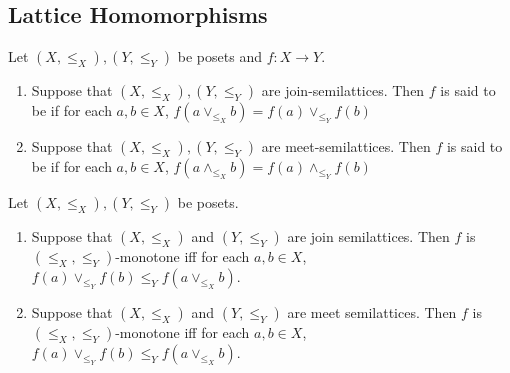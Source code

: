 \documentclass{book}
\begin{document}
	
	
	
	
	
	
	
	
	
	
	
	
	
	
	
	
	
	
	
	
	
	
	
	
	
	
	
	
	
	
	
	
	
	
	
	
	
	
	
	
	
	
	
	
	
	
	
	
	
	
	
	
	
	
	\subsection{Lattice Homomorphisms}
	
	\begin{defn}
		Let $(X, \leq_X), (Y, \leq_Y)$ be posets and $f:X \rightarrow Y$. 
		\begin{enumerate}
			\item Suppose that $(X, \leq_X), (Y, \leq_Y)$ are join-semilattices. Then $f$ is said to be  if for each $a,b \in X$, $f(a \vee_{\leq_X} b) = f(a) \vee_{\leq_Y} f(b)$
			\item Suppose that $(X, \leq_X), (Y, \leq_Y)$ are meet-semilattices. Then $f$ is said to be  if for each $a,b \in X$, $f(a \wedge_{\leq_X} b) = f(a) \wedge_{\leq_Y} f(b)$
		\end{enumerate}
	\end{defn}
	
	\begin{ex}
		Let $(X, \leq_X), (Y, \leq_Y)$ be posets. 
		\begin{enumerate}
			\item Suppose that $(X, \leq_X)$ and $(Y, \leq_Y)$ are join semilattices. Then $f$ is $(\leq_X, \leq_Y)$-monotone iff for each $a,b \in X$, $f(a) \vee_{\leq_Y} f(b) \leq_Y f(a \vee_{\leq_X} b)$.
			\item Suppose that $(X, \leq_X)$ and $(Y, \leq_Y)$ are meet semilattices. Then $f$ is $(\leq_X, \leq_Y)$-monotone iff for each $a,b \in X$, $f(a) \vee_{\leq_Y} f(b) \leq_Y f(a \vee_{\leq_X} b)$.
		\end{enumerate}
	\end{ex}
	
\end{document}
